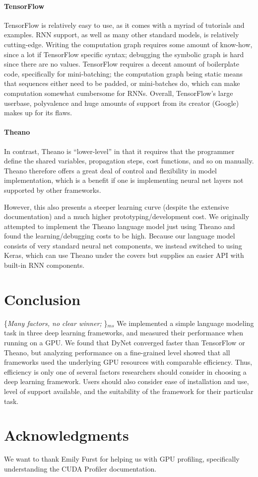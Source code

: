 \documentclass{article}
\newcommand{\ms}[1]{{\color{cyan}\{\textit{#1}\}$_{ms}$}}
\begin{document}
\paragraph{TensorFlow} TensorFlow is relatively easy to use, as it comes with a myriad of tutorials and examples. RNN support, as well as many other standard models, is relatively cutting-edge. Writing the computation graph requires some amount of know-how, since a lot if TensorFlow specific syntax; debugging the symbolic graph is hard since there are no values.
TensorFlow requires a decent amount of boilerplate code, specifically for mini-batching; the computation graph being static means that sequences either need to be padded, or mini-batches do, which can make computation somewhat cumbersome for RNNs. Overall, TensorFlow's large userbase, polyvalence and huge amounts of support from its creator (Google) makes up for its flaws.

\paragraph{Theano} 
In contrast, Theano is ``lower-level'' in that it requires that the programmer define the shared variables, propagation steps, cost functions, and so on manually. Theano therefore offers a great deal of control and flexibility in model implementation, which is a benefit if one is implementing neural net layers not supported by other frameworks.

However, this also presents a steeper learning curve (despite the extensive documentation) and a much higher prototyping/development cost. We originally attempted to implement the Theano language model just using Theano and found the learning/debugging costs to be high. Because our language model consists of very standard neural net components, we instead switched to using Keras, which can use Theano under the covers but supplies an easier API with built-in RNN components.



\section{Conclusion}
\ms{Many factors, no clear winner; }
We implemented a simple language modeling task in three deep learning frameworks, and measured their performance when running on a GPU. We found that DyNet converged faster than TensorFlow or Theano, but analyzing performance on a fine-grained level showed that all frameworks used the underlying GPU resources with comparable efficiency. Thus, efficiency is only one of several factors researchers should consider in choosing a deep learning framework. Users should also consider ease of installation and use, level of support available, and the suitability of the framework for their particular task.

\section*{Acknowledgments}
We want to thank Emily Furst for helping us with GPU profiling, specifically understanding the CUDA Profiler documentation.
\newpage


\end{document}
